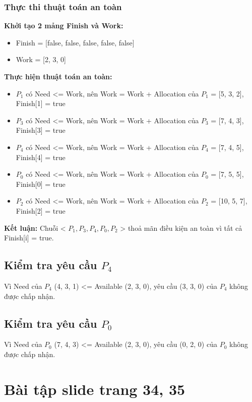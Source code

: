 \documentclass[12pt, letterpaper]{article}
\begin{document}
\subsubsection{Thực thi thuật toán an toàn}
\textbf{Khởi tạo 2 mảng Finish và Work:}
\begin{itemize}
    \item Finish = [false, false, false, false, false]
    \item Work = [2, 3, 0]
\end{itemize}

\noindent \textbf{Thực hiện thuật toán an toàn:}
\begin{itemize}
    \item $P_1$ có Need <= Work, nên Work = Work + Allocation của $P_1$ = [5, 3, 2], Finish[1] = true
    \item $P_3$ có Need <= Work, nên Work = Work + Allocation của $P_3$ = [7, 4, 3], Finish[3] = true
    \item $P_4$ có Need <= Work, nên Work = Work + Allocation của $P_4$ = [7, 4, 5], Finish[4] = true
    \item $P_0$ có Need <= Work, nên Work = Work + Allocation của $P_0$ = [7, 5, 5], Finish[0] = true
    \item $P_2$ có Need <= Work, nên Work = Work + Allocation của $P_2$ = [10, 5, 7], Finish[2] = true
\end{itemize}

\noindent \textbf{Kết luận:} Chuỗi < $P_1, P_3, P_4, P_0, P_2$ > thoả mãn điều kiện an toàn vì tất cả Finish[i] = true.

\subsection{Kiểm tra yêu cầu $P_4$}
Vì Need của $P_4$ (4, 3, 1) <= Available (2, 3, 0), yêu cầu (3, 3, 0) của $P_4$ không được chấp nhận.

\subsection{Kiểm tra yêu cầu $P_0$}
Vì Need của $P_0$ (7, 4, 3) <= Available (2, 3, 0), yêu cầu (0, 2, 0) của $P_0$ không được chấp nhận.
\section{Bài tập slide trang 34, 35}
\end{document}
